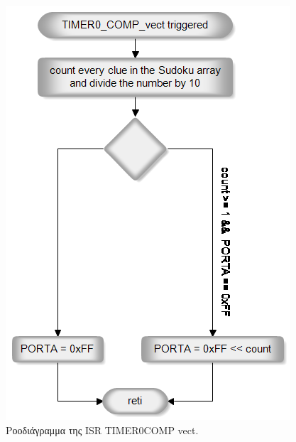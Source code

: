 \documentclass[a4paper,12pt]{article}
\begin{document}
\begin{figure}[h!]
\centering
\includegraphics[scale=0.75]{TIMER0_COMP.png}
\caption{Ροοδιάγραμμα της ISR TIMER0\textunderscore COMP \textunderscore vect.}
\label{fig:TIMER0_COMP_vect_flo}
\end{figure}
\end{document}
